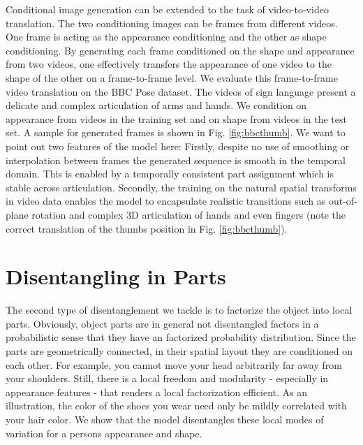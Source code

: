 	Conditional image generation can be extended to the task of {video-to-video translation}. The two conditioning images can be frames from different videos. One frame is acting as the appearance conditioning and the other as shape conditioning. By generating each frame conditioned on the shape and appearance from two videos, one effectively transfers the appearance of one video to the shape of the other on a frame-to-frame level.
	We evaluate this frame-to-frame video translation on the BBC Pose dataset. The videos of sign language present a delicate and complex articulation of arms and hands. We condition on appearance from videos in the training set and on shape from videos in the test set. A sample for generated frames is shown in Fig. \ref{fig:bbcthumb}.
	We want to point out two features of the model here: Firstly, despite no use of smoothing or interpolation between frames the generated sequence is smooth in the temporal domain. This is enabled by a temporally consistent part assignment which is stable across articulation.
	Secondly, the training on the natural spatial transforms in video data enables the model to encapsulate realistic transitions such as out-of-plane rotation and complex 3D articulation of \eg hands and even fingers (note the correct translation of the thumbs position in Fig. \ref{fig:bbcthumb}). \\

\section{Disentangling in Parts}\label{sec:partwise}
	The second type of disentanglement we tackle is to factorize the object into local parts. Obviously, object parts are in general not disentangled factors in a probabilistic sense that they have an factorized probability distribution. Since the parts are geometrically connected, in their spatial layout they are conditioned on each other. For example, you cannot move your head arbitrarily far away from your shoulders. Still, there is a local freedom and modularity - especially in appearance features - that renders a local factorization efficient. As an illustration, the color of the shoes you wear need only be mildly correlated with your hair color.
	We show that the model disentangles these local modes of variation for a persons appearance and shape.

